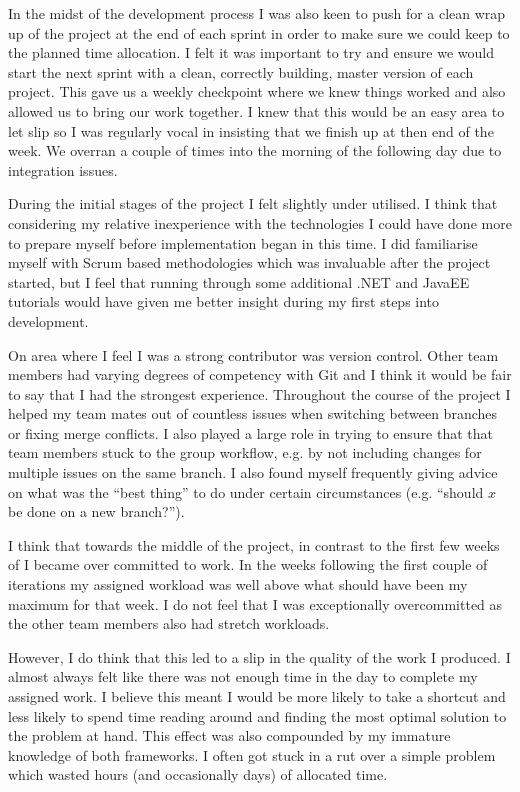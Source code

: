 \documentclass[paper=a4, fontsize=11pt]{scrartcl}	%
\numberwithin{equation}{section}															%
\numberwithin{figure}{section}																%
\numberwithin{table}{section}
\begin{document}
In the midst of the development process I was also keen to push for a clean wrap up of the project at the end of each sprint in order to make sure we could keep to the planned time allocation. I felt it was important to try and ensure we would start the next sprint with a clean, correctly building, master version of each project. This gave us a weekly checkpoint where we knew things worked and also allowed us to bring our work together. I knew that this would be an easy area to let slip so I was regularly vocal in insisting that we finish up at then end of the week. We overran a couple of times into the morning of the following day due to integration issues.  

During the initial stages of the project I felt slightly under utilised. I think that considering my relative inexperience with the technologies I could have done more to prepare myself before implementation began in this time. I did familiarise myself with Scrum based methodologies which was invaluable after the project started, but I feel that running through some additional .NET and JavaEE tutorials would have given me better insight during my first steps into development. 

On area where I feel I was a strong contributor was version control. Other team members had varying degrees of competency with Git and I think it would be fair to say that I had the strongest experience. Throughout the course of the project I helped my team mates out of countless issues when switching between branches or fixing merge conflicts. I also played a large role in trying to ensure that that team members stuck to the group workflow, e.g. by not including changes for multiple issues on the same branch. I also found myself frequently giving advice on what was the ``best thing'' to do under certain circumstances (e.g. ``should $x$ be done on a new branch?'').  

I think that towards the middle of the project, in contrast to the first few weeks of I became over committed to work. In the weeks following the first couple of iterations my assigned workload was well above what should have been my maximum for that week. I do not feel that I was exceptionally overcommitted as the other team members also had stretch workloads. 

However, I do think that this led to a slip in the quality of the work I produced. I almost always felt like there was not enough time in the day to complete my assigned work. I believe this meant I would be more likely to take a shortcut and less likely to spend time reading around and finding the most optimal solution to the problem at hand. This effect was also compounded by my immature knowledge of both frameworks. I often got stuck in a rut over a simple problem which wasted hours (and occasionally days) of allocated time.
\end{document}
